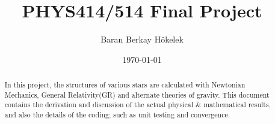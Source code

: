 \documentclass[aps,twocolumn,showpacs,preprintnumbers,nofootinbib,prl,superscriptaddress,groupedaddress]{revtex4-2}
\begin{document}
\title{PHYS414/514 Final Project}
\author{Baran Berkay H\"okelek} 
\date{\today}

\begin{abstract}
In this project, the structures of various stars are calculated with Newtonian Mechanics, General Relativity(GR) and alternate theories of gravity. This document contains the derivation and discussion of the actual physical \& mathematical results, and also the details of the coding; such as unit testing and convergence. 
\end{abstract}
\maketitle


\end{document}
